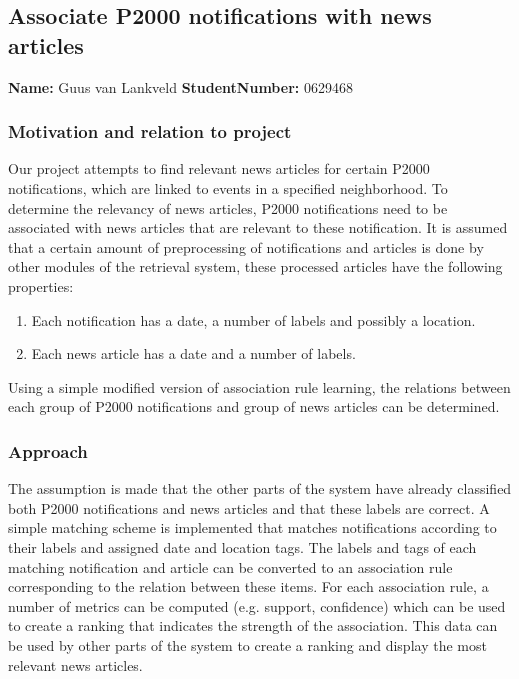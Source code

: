 \subsection{Associate P2000 notifications with news articles}
\textbf{Name:}  Guus van Lankveld \indent \textbf{StudentNumber:} 0629468

\subsubsection*{Motivation and relation to project}
Our project attempts to find relevant news articles for certain P2000 notifications, which are linked to events in a specified neighborhood. To determine the relevancy of news articles, P2000 notifications need to be associated with news articles that are relevant to these notification. It is assumed that a certain amount of preprocessing of notifications and articles is done by other modules of the retrieval system, these processed articles have the following properties:
\begin{enumerate}
\item Each notification has a date, a number of labels and possibly a location.
\item Each news article has a date and a number of labels.
\end{enumerate}
Using a simple modified version of association rule learning, the relations between each group of P2000 notifications and group of news articles can be determined.  

\subsubsection*{Approach}
The assumption is made that the other parts of the system have already classified both P2000 notifications and news articles and that these labels are correct. A simple matching scheme is implemented that matches notifications according to their labels and assigned date and location tags. The labels and tags of each matching notification and article can be converted to an association rule corresponding to the relation between these items. For each association rule, a number of metrics can be computed (e.g. support, confidence) which can be used to create a ranking that indicates the strength of the association. This data can be used by other parts of the system to create a ranking and display the most relevant news articles.

